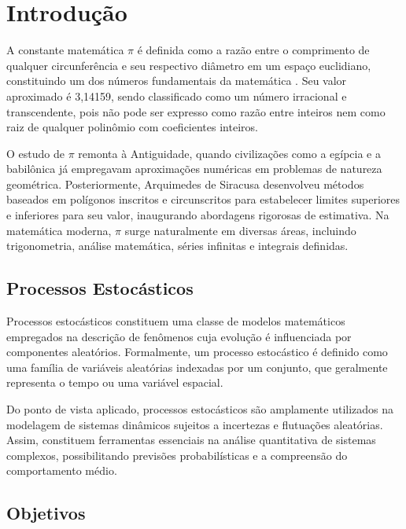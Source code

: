 \chapter{Introdução}\label{cap:introducao}

A constante matemática \texorpdfstring{$\pi$}{pi} é definida como a razão entre o comprimento de qualquer circunferência e seu respectivo diâmetro em um espaço euclidiano, constituindo um dos números fundamentais da matemática \cite{diniz2018}. Seu valor aproximado é 3,14159, sendo classificado como um número irracional e transcendente, pois não pode ser expresso como razão entre inteiros nem como raiz de qualquer polinômio com coeficientes inteiros.

O estudo de \texorpdfstring{$\pi$}{pi} remonta à Antiguidade, quando civilizações como a egípcia e a babilônica já empregavam aproximações numéricas em problemas de natureza geométrica. Posteriormente, Arquimedes de Siracusa desenvolveu métodos baseados em polígonos inscritos e circunscritos para estabelecer limites superiores e inferiores para seu valor, inaugurando abordagens rigorosas de estimativa. Na matemática moderna, \texorpdfstring{$\pi$}{pi} surge naturalmente em diversas áreas, incluindo trigonometria, análise matemática, séries infinitas e integrais definidas.

\section{Processos Estocásticos}

Processos estocásticos \cite{gardiner2009} constituem uma classe de modelos matemáticos empregados na descrição de fenômenos cuja evolução é influenciada por componentes aleatórios. Formalmente, um processo estocástico é definido como uma família de variáveis aleatórias indexadas por um conjunto, que geralmente representa o tempo ou uma variável espacial.

Do ponto de vista aplicado, processos estocásticos são amplamente utilizados na modelagem de sistemas dinâmicos sujeitos a incertezas e flutuações aleatórias. Assim, constituem ferramentas essenciais na análise quantitativa de sistemas complexos, possibilitando previsões probabilísticas e a compreensão do comportamento médio.

\section{Objetivos}

